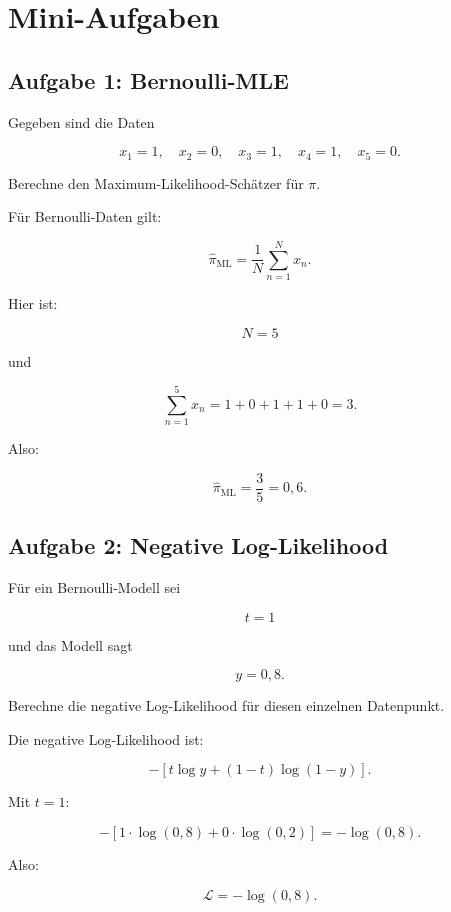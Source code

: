 \section{Mini-Aufgaben}

\subsection{Aufgabe 1: Bernoulli-MLE}

Gegeben sind die Daten

\[
    x_1=1,
    \quad
    x_2=0,
    \quad
    x_3=1,
    \quad
    x_4=1,
    \quad
    x_5=0.
\]

Berechne den Maximum-Likelihood-Schätzer für \(\pi\).

\begin{examplebox}
Für Bernoulli-Daten gilt:

\[
    \hat{\pi}_{\mathrm{ML}}
    =
    \frac{1}{N}
    \sum_{n=1}^{N}
    x_n.
\]

Hier ist:

\[
    N=5
\]

und

\[
    \sum_{n=1}^{5}
    x_n
    =
    1+0+1+1+0
    =
    3.
\]

Also:

\[
    \hat{\pi}_{\mathrm{ML}}
    =
    \frac{3}{5}
    =
    0{,}6.
\]
\end{examplebox}

\subsection{Aufgabe 2: Negative Log-Likelihood}

Für ein Bernoulli-Modell sei

\[
    t=1
\]

und das Modell sagt

\[
    y = 0{,}8.
\]

Berechne die negative Log-Likelihood für diesen einzelnen Datenpunkt.

\begin{examplebox}
Die negative Log-Likelihood ist:

\[
    -\left[
        t\log y
        +
        (1-t)\log(1-y)
    \right].
\]

Mit \(t=1\):

\[
    -\left[
        1\cdot\log(0{,}8)
        +
        0\cdot\log(0{,}2)
    \right]
    =
    -\log(0{,}8).
\]

Also:

\[
    \mathcal{L}
    =
    -\log(0{,}8).
\]
\end{examplebox}

